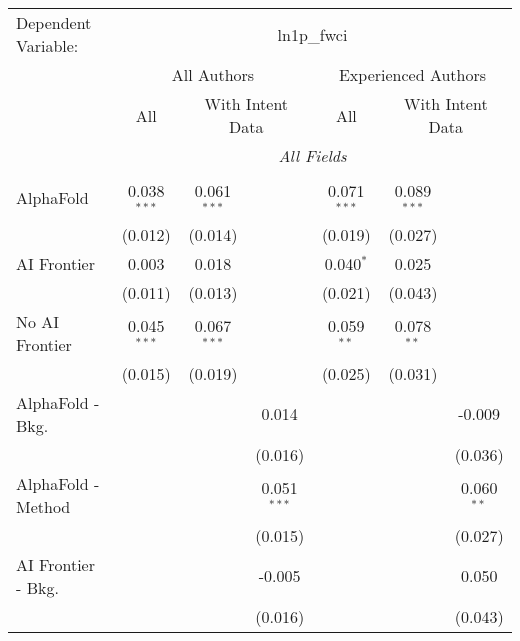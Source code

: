\begingroup
\centering
\begin{tabular}{lcccccc}
   \tabularnewline \midrule \midrule
   Dependent Variable: & \multicolumn{6}{c}{ln1p\_fwci}\\
 & \multicolumn{3}{c}{All Authors} & \multicolumn{3}{c}{Experienced Authors} \\
\cmidrule(lr){2-4} \cmidrule(lr){5-7}
 & \multicolumn{1}{c}{All} & \multicolumn{2}{c}{With Intent Data} & \multicolumn{1}{c}{All} & \multicolumn{2}{c}{With Intent Data} \\
\cmidrule(lr){2-2} \cmidrule(lr){3-4} \cmidrule(lr){5-5} \cmidrule(lr){6-7}
 & \multicolumn{6}{c}{\textit{All Fields}} \\ \\
   AlphaFold               & 0.038$^{***}$ & 0.061$^{***}$ &               & 0.071$^{***}$ & 0.089$^{***}$ &   \\   
                           & (0.012)       & (0.014)       &               & (0.019)       & (0.027)       &   \\   
   AI Frontier             & 0.003         & 0.018         &               & 0.040$^{*}$   & 0.025         &   \\   
                           & (0.011)       & (0.013)       &               & (0.021)       & (0.043)       &   \\   
   No AI Frontier          & 0.045$^{***}$ & 0.067$^{***}$ &               & 0.059$^{**}$  & 0.078$^{**}$  &   \\   
                           & (0.015)       & (0.019)       &               & (0.025)       & (0.031)       &   \\   
   AlphaFold - Bkg.        &               &               & 0.014         &               &               & -0.009\\   
                           &               &               & (0.016)       &               &               & (0.036)\\   
   AlphaFold - Method      &               &               & 0.051$^{***}$ &               &               & 0.060$^{**}$\\   
                           &               &               & (0.015)       &               &               & (0.027)\\   
   AI Frontier - Bkg.      &               &               & -0.005        &               &               & 0.050\\   
                           &               &               & (0.016)       &               &               & (0.043)\\   

\end{tabular}
